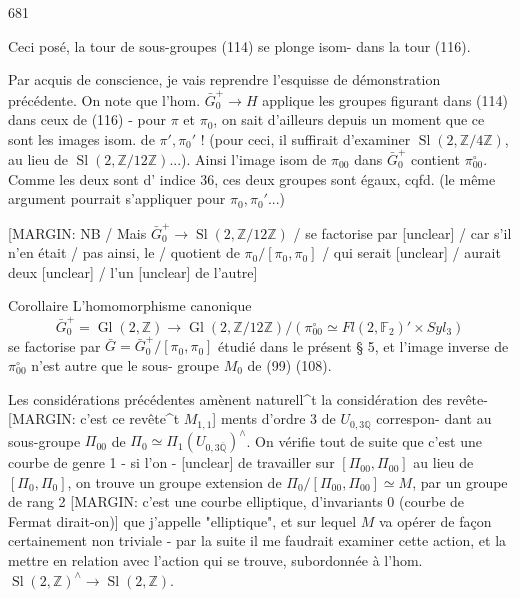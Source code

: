 
681

Ceci posé, la tour de sous-groupes (114) se
plonge isom- dans la tour (116).

Par acquis de conscience, je vais reprendre
l'esquisse de démonstration précédente. On
note que l'hom. $\bar{G}_0^+ \to H$ applique
les groupes figurant dans (114) dans
ceux de (116) - pour $\pi$ et $\pi_0$, on sait
d'ailleurs depuis un moment que ce
sont les images isom. de $\pi', \pi_0'$ !
(pour ceci, il suffirait d'examiner
$\operatorname{Sl}(2, \mathbb{Z}/4\mathbb{Z})$, au lieu de $\operatorname{Sl}(2, \mathbb{Z}/12\mathbb{Z})$...).
Ainsi l'image isom de $\pi_{00}$ dans $\bar{G}_0^+$
contient $\pi_{00}^\circ$. Comme les deux sont d'
indice 36, ces deux groupes sont égaux,
cqfd. (le même argument pourrait s'appliquer
pour $\pi_0, \pi_0'$...)

[MARGIN: NB / Mais $\bar{G}_0^+ \to \operatorname{Sl}(2, \mathbb{Z}/12\mathbb{Z})$ / se factorise par [unclear] / car s'il n'en était / pas ainsi, le / quotient de $\pi_0 / [\pi_0, \pi_0]$ / qui serait [unclear] / aurait deux [unclear] / l'un [unclear] de l'autre]

Corollaire L'homomorphisme canonique
$$ \bar{G}_0^+ = \operatorname{Gl}(2, \mathbb{Z}) \longrightarrow \operatorname{Gl}(2, \mathbb{Z}/12\mathbb{Z}) / (\pi_{00}^\circ \simeq Fl(2, \mathbb{F}_2)' \times Syl_3) $$
se factorise par $\bar{G} = \bar{G}_0^+ / [\pi_0, \pi_0]$
étudié dans le présent § 5, et l'image
inverse de $\pi_{00}^\circ$ n'est autre que le sous-
groupe $M_0$ de (99) (108).

\newpage


Les considérations précédentes amènent
naturell^t la considération des revête-
[MARGIN: c'est ce revête^t $M_{1,1}$] ments d'ordre 3 de $U_{0,3 \mathbb{Q}}$ correspon-
dant au sous-groupe $\Pi_{00}$ de $\Pi_0 \simeq \Pi_{1}(U_{0,3 \overline{\mathbb{Q}}})^{\wedge}$.
On vérifie tout de suite que c'est
une courbe de genre 1 - si l'on
- [unclear] de travailler sur
$[\Pi_{00}, \Pi_{00}]$ au lieu de $[\Pi_0, \Pi_0]$, on
trouve un groupe extension de
$\Pi_0 / [\Pi_{00}, \Pi_{00}] \simeq M$, par un groupe de rang 2
[MARGIN: c'est une courbe elliptique, d'invariants 0 (courbe de Fermat dirait-on)] que j'appelle "elliptique", et sur
lequel $M$ va opérer de façon
certainement non triviale - par la suite
il me faudrait examiner cette action,
et la mettre en relation avec l'action
qui se trouve, subordonnée à
l'hom. $\operatorname{Sl}(2, \mathbb{Z})^{\wedge} \longrightarrow \operatorname{Sl}(2, \mathbb{Z})$.

